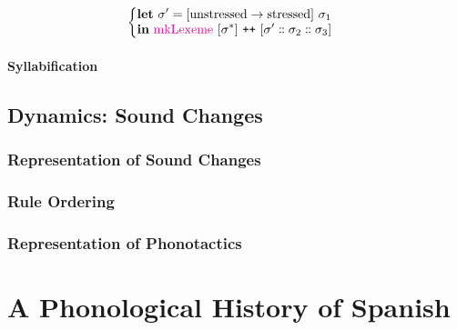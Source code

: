 \documentclass{report}[12pt]
\begin{document}
\begin{align*}
\begin{cases}
\begin{aligned}
                                                                                     & \textbf{let}\ \sigma' = [\text{unstressed} \rightarrow \text{stressed}]\ \sigma_1 \\
                                                                                     & \textbf{in}\ \text{\textcolor{magenta}{mkLexeme}}\ [\sigma^{*}]\ \texttt{++}\ [\sigma' \dblcolon \sigma_2 \dblcolon \sigma_3] \\
                                                                                   \end{aligned} \\
                                                      \end{cases}
\end{align*}

\subsection{Syllabification}

\chapter{Dynamics: Sound Changes}


\section{Representation of Sound Changes}

\section{Rule Ordering}

\section{Representation of Phonotactics}

\part*{A Phonological History of Spanish}
\end{document}
